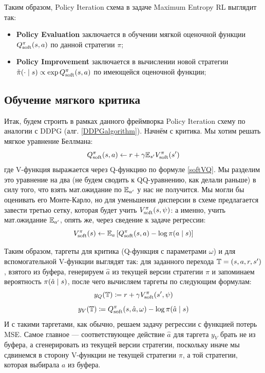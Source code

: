 Таким образом, Policy Iteration схема в задаче Maximum Entropy RL выглядит так:
\begin{itemize}
    \item \textbf{Policy Evaluation} заключается в обучении мягкой оценочной функции $Q^{\pi}_{\mathrm{soft}}(s, a)$ по данной стратегии $\pi$;
    \item \textbf{Policy Improvement} заключается в вычислении новой стратегии $\tilde{\pi}(\cdot \mid s) \propto \exp Q^{\pi}_{\mathrm{soft}}(s, a)$ по имеющейся оценочной функции;
\end{itemize}

\subsection{Обучение мягкого критика}

Итак, будем строить в рамках данного фреймворка Policy Iteration схему по аналогии с DDPG (алг. \ref{DDPGalgorithm}). Начнём с критика. Мы хотим решать мягкое уравнение Беллмана:
$$Q^\pi_{\mathrm{soft}}(s, a) \leftarrow r + \gamma \mathbb{E}_{s'} V_{\mathrm{soft}}^\pi(s') $$
где V-функция выражается через Q-функцию по формуле \eqref{softVQ}. Мы разделим это уравнение на два (не будем сводить к QQ-уравнению, как делали раньше) в силу того, что взять мат.ожидание по $\mathbb{E}_{a'}$ у нас не получится. Мы могли бы оценивать его Монте-Карло, но для уменьшения дисперсии в схеме предлагается завести третью сетку, которая будет учить $V^\pi_{\mathrm{soft}}(s, \psi)$: а именно, учить мат.ожидание $\mathbb{E}_{a'}$, опять же, через сведение к задаче регрессии:
$$V_{\mathrm{soft}}^\pi(s) \leftarrow \mathbb{E}_{a} \left[ Q^\pi_{\mathrm{soft}}(s, a) - \log \pi(a \mid s) \right]$$

Таким образом, таргеты для критика (Q-функция с параметрами $\omega$) и для вспомогательной V-функции выглядят так: для заданного перехода $\T \HM= (s, a, r, s')$, взятого из буфера, генерируем $\hat{a}$ из текущей версии стратегии $\pi$ и запоминаем вероятность $\pi(\hat{a} \HM\mid s)$, после чего вычисляем таргеты по следующим формулам:
$$y_Q(\mathbb{T}) \coloneqq r + \gamma V^\pi_{\mathrm{soft}}(s', \psi)$$
$$y_V(\mathbb{T}) \coloneqq Q^\pi_{\mathrm{soft}}(s, \hat{a}, \omega) - \log \pi(\hat{a} \mid s)$$
И с такими таргетами, как обычно, решаем задачу регрессии с функцией потерь MSE. Самое главное --- соответствующее действие $\hat{a}$ для таргета $y_V$ брать не из буфера, а сгенерировать из текущей версии стратегии, поскольку иначе мы сдвинемся в сторону V-функции не текущей стратегии $\pi$, а той стратегии, которая выбирала $a$ из буфера.


